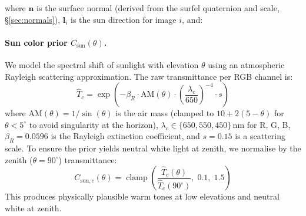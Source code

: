 \documentclass[conference]{IEEEtran}
\begin{document}
\noindent where $\mathbf{n}$ is the surface normal (derived from the surfel quaternion and scale, \S\ref{sec:normals}), $\mathbf{l}_i$ is the sun direction for image $i$, and:

\paragraph{Sun color prior $C_{\text{sun}}(\theta)$.}
We model the spectral shift of sunlight with elevation $\theta$ using an atmospheric Rayleigh scattering approximation.
The raw transmittance per RGB channel is:
\begin{equation}
    \hat{T}_c = \exp\!\left(-\beta_R \cdot \text{AM}(\theta) \cdot \left(\frac{\lambda_c}{650}\right)^{-4} \cdot s\right)
    \label{eq:sun_color}
\end{equation}
where $\text{AM}(\theta) = 1/\sin(\theta)$ is the air mass (clamped to $10 + 2(5 - \theta)$ for $\theta < 5^\circ$ to avoid singularity at the horizon), $\lambda_c \in \{650, 550, 450\}$\,nm for R, G, B, $\beta_R = 0.0596$ is the Rayleigh extinction coefficient, and $s = 0.15$ is a scattering scale.
To ensure the prior yields neutral white light at zenith, we normalise by the zenith ($\theta = 90^\circ$) transmittance:
\begin{equation}
    C_{\text{sun},c}(\theta) = \operatorname{clamp}\!\left(\frac{\hat{T}_c(\theta)}{\hat{T}_c(90^\circ)},\; 0.1,\; 1.5\right)
\end{equation}
This produces physically plausible warm tones at low elevations and neutral white at zenith.
\end{document}
